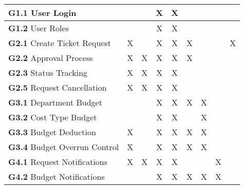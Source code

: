 \documentclass{article}
\begin{document}
\begin{footnotesize}
\begin{longtable}{|l| *{8}{c|}}
\textbf{G1.1} User Login & & & X & X & & & & \\ \hline
\textbf{G1.2} User Roles & & & X & X & & & & \\ \hline
\textbf{G2.1} Create Ticket Request & X & & X & X & X & & & X \\ \hline
\textbf{G2.2} Approval Process & X & X & X & X & X & & & \\ \hline
\textbf{G2.3} Status Tracking & X & X & X & X & & & & \\ \hline
\textbf{G2.5} Request Cancellation & X & X & X & X & & & & \\ \hline
\textbf{G3.1} Department Budget & & & X & X & X & X & & \\ \hline
\textbf{G3.2} Cost Type Budget & & & X & X & & X & & \\ \hline
\textbf{G3.3} Budget Deduction & X & & X & X & X & X & & \\ \hline
\textbf{G3.4} Budget Overrun Control & X & & X & X & X & X & & \\ \hline
\textbf{G4.1} Request Notifications & X & X & X & X & & & X & \\ \hline
\textbf{G4.2} Budget Notifications & & & X & X & X & X & X & \\ \hline
\end{longtable}
\end{footnotesize}
\end{document}
